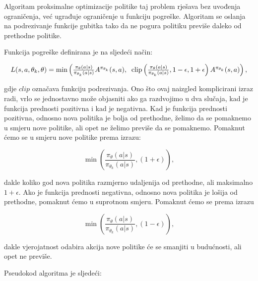 \documentclass[times,utf8,diplomski]{fer}
\begin{document}
Algoritam proksimalne optimizacije politike taj problem rješava bez uvođenja ograničenja, već ugrađuje ograničenje u funkciju pogreške. Algoritam se oslanja na podrezivanje funkcije gubitka tako da ne pogura politiku previše daleko od prethodne politike.

Funkcija pogreške definirana je na sljedeći način:

\begin{equation}
	\label{PPO loss}
	\resizebox{0.99\hsize}{!}{$L(s,a,\theta_k,\theta) = \min\left(
			\frac{\pi_{\theta}(a|s)}{\pi_{\theta_k}(a|s)}  A^{\pi_{\theta_k}}(s,a), \;\;
			\text{clip}\left(\frac{\pi_{\theta}(a|s)}{\pi_{\theta_k}(a|s)}, 1 - \epsilon, 1+\epsilon \right) A^{\pi_{\theta_k}}(s,a)
			\right),$}
\end{equation}

\noindent gdje ${clip}$ označava funkciju podrezivanja. Ono što ovaj naizgled komplicirani izraz radi, vrlo se jednostavno može objasniti ako ga razdvojimo u dva slučaja, kad je funkcija prednosti pozitivna i kad je negativna. Kad je funkcija prednosti pozitivna, odnosno nova politika je bolja od prethodne, želimo da se pomaknemo u smjeru nove politike, ali opet ne želimo previše da se pomaknemo. Pomaknut ćemo se u smjeru nove politike prema izrazu:

\begin{equation}
	\label{PPO adv gain}
	\min\left(
	\frac{\pi_{\theta}(a|s)}{\pi_{\theta_k}(a|s)}, (1 + \epsilon)
	\right),
\end{equation}

\noindent dakle koliko god nova politika razmjerno udaljenija od prethodne, ali maksimalno ${1+\epsilon}$. Ako je funkcija prednosti negativna, odnosno nova politika je lošija od prethodne, pomaknut ćemo u suprotnom smjeru. Pomaknut ćemo se prema izrazu


\begin{equation}
	\label{PPO adv loss}
	\min\left(
	\frac{\pi_{\theta}(a|s)}{\pi_{\theta_k}(a|s)}, (1 - \epsilon)
	\right),
\end{equation}

\noindent dakle vjerojatnost odabira akcija nove politike će se smanjiti u budućnosti, ali opet ne previše.

Pseudokod algoritma je sljedeći:
\end{document}
